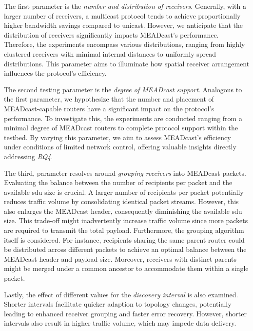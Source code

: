 The first parameter is the \textit{number and distribution of receivers}.
Generally, with a larger number of receivers, a multicast protocol tends to
    achieve proportionally higher bandwidth savings compared to unicast.
However, we anticipate that the distribution of receivers significantly impacts
    MEADcast's performance.
Therefore, the experiments encompass various distributions, ranging from highly
    clustered receivers with minimal internal distances to uniformly spread
    distributions.
This parameter aims to illuminate how spatial receiver arrangement influences
    the protocol's efficiency.

The second testing parameter is the \textit{degree of MEADcast support}.
Analogous to the first parameter, we hypothesize that the number and placement
    of MEADcast-capable routers have a significant impact on the protocol's
    performance.
To investigate this, the experiments are conducted ranging from a minimal
    degree of MEADcast routers to complete protocol support within the testbed.
By varying this parameter, we aim to assess MEADcast's efficiency under
    conditions of limited network control, offering valuable insights
    directly addressing \textit{RQ4}.

The third, parameter resolves around \textit{grouping receivers} into MEADcast
    packets.
Evaluating the balance between the number of recipients per packet and the
    available \gls{sdu} size is crucial.
A larger number of recipients per packet potentially reduces traffic volume by
    consolidating identical packet streams.
However, this also enlarges the MEADcast header, consequently diminishing the
    available \gls{sdu} size.
This trade-off might inadvertently increase traffic volume since more packets
    are required to transmit the total payload.
Furthermore, the grouping algorithm itself is considered.
For instance, recipients sharing the same parent router could be distributed
    across different packets to achieve an optimal balance between the MEADcast
    header and payload size.
Moreover, receivers with distinct parents might be merged under a common
    ancestor to accommodate them within a single packet.

Lastly, the effect of different values for the \textit{discovery interval} is
    also examined.
Shorter intervals facilitate quicker adaption to topology changes,
    potentially leading to enhanced receiver grouping and faster error
    recovery.
However, shorter intervals also result in higher traffic volume, which may
    impede data delivery.


